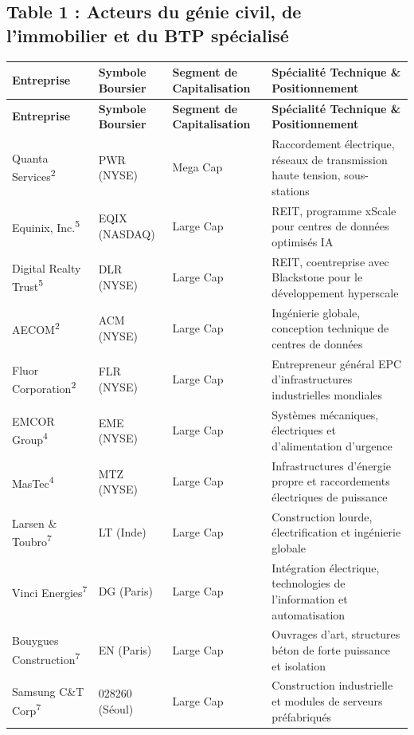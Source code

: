 \documentclass[11pt,a4paper]{article}
\begin{document}
\subsection*{Table 1 : Acteurs du génie civil, de l'immobilier et du BTP spécialisé}
\begin{longtable}{p{3cm} p{3.5cm} p{3cm} p{5cm}}
\toprule
\textbf{Entreprise} & \textbf{Symbole Boursier} & \textbf{Segment de Capitalisation} & \textbf{Spécialité Technique \& Positionnement} \\
\midrule
\endfirsthead
\toprule
\textbf{Entreprise} & \textbf{Symbole Boursier} & \textbf{Segment de Capitalisation} & \textbf{Spécialité Technique \& Positionnement} \\
\midrule
\endhead
Quanta Services\textsuperscript{2} & PWR (NYSE) & Mega Cap & Raccordement électrique, réseaux de transmission haute tension, sous-stations \\
Equinix, Inc.\textsuperscript{5} & EQIX (NASDAQ) & Large Cap & REIT, programme xScale pour centres de données optimisés IA \\
Digital Realty Trust\textsuperscript{5} & DLR (NYSE) & Large Cap & REIT, coentreprise avec Blackstone pour le développement hyperscale \\
AECOM\textsuperscript{2} & ACM (NYSE) & Large Cap & Ingénierie globale, conception technique de centres de données \\
Fluor Corporation\textsuperscript{2} & FLR (NYSE) & Large Cap & Entrepreneur général EPC d'infrastructures industrielles mondiales \\
EMCOR Group\textsuperscript{4} & EME (NYSE) & Large Cap & Systèmes mécaniques, électriques et d'alimentation d'urgence \\
MasTec\textsuperscript{4} & MTZ (NYSE) & Large Cap & Infrastructures d'énergie propre et raccordements électriques de puissance \\
Larsen \& Toubro\textsuperscript{7} & LT (Inde) & Large Cap & Construction lourde, électrification et ingénierie globale \\
Vinci Energies\textsuperscript{7} & DG (Paris) & Large Cap & Intégration électrique, technologies de l'information et automatisation \\
Bouygues Construction\textsuperscript{7} & EN (Paris) & Large Cap & Ouvrages d'art, structures béton de forte puissance et isolation \\
Samsung C\&T Corp\textsuperscript{7} & 028260 (Séoul) & Large Cap & Construction industrielle et modules de serveurs préfabriqués \\

\end{longtable}
\end{document}
